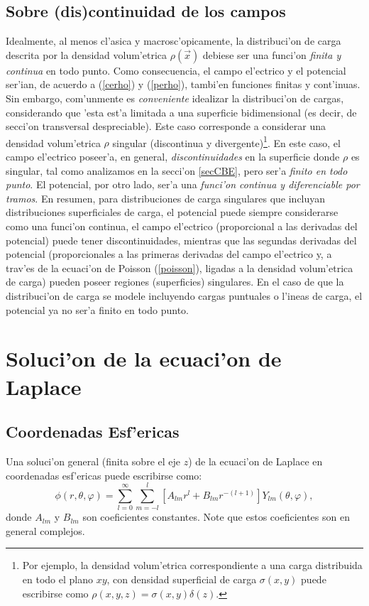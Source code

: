 \subsection{Sobre (dis)continuidad de los campos}
 Idealmente, al menos cl'asica y macrosc'opicamente, la distribuci'on de carga descrita por la densidad volum'etrica $\rho(\vec{x})$ debiese ser una funci'on \textit{finita y continua} en todo punto. Como consecuencia, el campo el'ectrico y el potencial ser'ian, de acuerdo a (\ref{cerho}) y (\ref{perho}), tambi'en funciones finitas y cont'inuas. Sin embargo, com'unmente es \textit{conveniente} idealizar la distribuci'on de cargas, considerando que 'esta est'a limitada a una superficie bidimensional (es decir, de secci'on transversal despreciable). Este caso corresponde a considerar una densidad volum'etrica $\rho$ singular (discontinua y divergente)\footnote{Por ejemplo, la densidad volum'etrica correspondiente a una carga distribuida en todo el plano $xy$, con densidad superficial de carga $\sigma(x,y)$ puede escribirse como $\rho(x,y,z)=\sigma(x,y)\delta(z)$.}. En este caso, el campo el'ectrico poseer'a, en general, \textit{discontinuidades} en la superficie donde $\rho$ es singular, tal como analizamos en la secci'on \ref{secCBE}, pero ser'a \textit{finito en todo punto}. El potencial, por otro lado, ser'a una \textit{funci'on continua y diferenciable por tramos}. En resumen, para distribuciones de carga singulares que incluyan distribuciones superficiales de carga, el potencial puede siempre considerarse como una funci'on continua, el campo el'ectrico (proporcional a las derivadas del potencial) puede tener discontinuidades, mientras que las segundas derivadas del potencial (proporcionales a las primeras derivadas del campo el'ectrico y, a trav'es de la ecuaci'on de Poisson (\ref{poisson}), ligadas a la densidad volum'etrica de carga) pueden poseer regiones (superficies) singulares. En el caso de que la distribuci'on de carga se modele incluyendo cargas puntuales o l'ineas de carga, el potencial ya no ser'a finito en todo punto.


\section{Soluci'on de la ecuaci'on de Laplace}
\subsection{Coordenadas Esf'ericas}
Una soluci'on general (finita sobre el eje $z$) de la ecuaci'on de Laplace en coordenadas esf'ericas puede escribirse como:
\begin{equation}
  \boxed{\phi(r,\theta,\varphi) = \sum_{l=0}^\infty\sum_{m=-l}^l\left[
  A_{lm}  r^l + B_{lm}  r^{-(l+1)}\right]  Y_{lm}(\theta,\varphi),}
  \label{est31b}
\end{equation}
donde $A_{lm}$ y $B_{lm}$ son coeficientes constantes. Note que estos
coeficientes son en general complejos.

